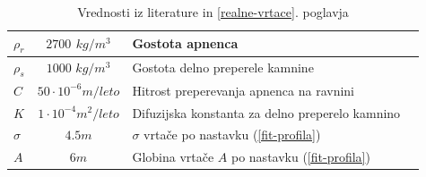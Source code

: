 \documentclass[a4paper, oneside, 12pt]{book}
\begin{document}
  \begin{table}[H]
    \centering
    \begin{tabular}{| l | c | l | l |} \hline
      $\rho_r$ & $2700$ $kg/m^3$ & Gostota apnenca                                            \\ \hline
      $\rho_s$ & $1000$ $kg/m^3$ & Gostota delno preperele kamnine                            \\ \hline
      $C$      & $50 \cdot 10^{-6} m/leto$  & Hitrost preperevanja apnenca na ravnini         \\ \hline
      $K$      & $1 \cdot 10^{-4} m^2/leto$ & Difuzijska konstanta za delno preperelo kamnino \\ \hline
      $\sigma$ & $4.5m$ & $\sigma$ vrtače po nastavku (\ref{fit-profila})                     \\ \hline
      $A$      & $6m$ & Globina vrtače $A$ po nastavku (\ref{fit-profila})                    \\ \hline
    \end{tabular}
    \caption{Vrednosti iz literature \cite{Gams1967} \cite{ford2007karst} \cite{fleurant2008modelling} in \ref{realne-vrtace}. poglavja}
    \label{tab:tabela-konstant}
  \end{table}
\end{document}
